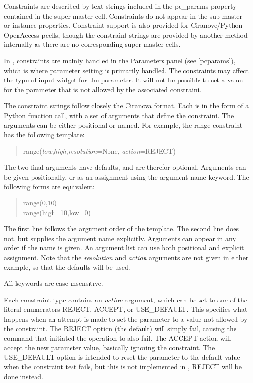 Constraints are described by text strings included in the {\et
pc\_params} property contained in the super-master cell.  Constraints
do not appear in the sub-master or instance properties.
\ifoa
Constraint support is also provided for Ciranove/Python OpenAccess
pcells, though the constraint strings are provided by another method
internally as there are no corresponding super-master {\Xic} cells.
\fi

In {\Xic}, constraints are mainly handled in the {\cb Parameters}
panel (see \ref{pcparams}), which is where parameter setting is
primarily handled.  The constraints may affect the type of input
widget for the parameter.  It will not be possible to set a value for
the parameter that is not allowed by the associated constraint.

The constraint strings follow closely the Ciranova format.  Each is in
the form of a Python function call, with a set of arguments that
define the constraint.  The arguments can be either positional or
named.  For example, the {\vt range} constraint has the following
template:

\begin{quote}
{\vt range(}{\it low\/},{\it high\/},{\it resolution\/}={\vt None},{\it
 action\/}={\vt REJECT)}
\end{quote}

The two final arguments have defaults, and are therefor optional. 
Arguments can be given positionally, or as an assignment using the
argument name keyword.  The following forms are equivalent:

\begin{quote} \vt
range(0,10)\\
range(high=10,low=0)
\end{quote}

The first line follows the argument order of the template.  The second
line does not, but supplies the argument name explicitly.  Arguments
can appear in any order if the name is given.  An argument list can
use both positional and explicit assignment.  Note that the {\it
resolution} and {\it action} arguments are not given in either
example, so that the defaults will be used.

All keywords are case-insensitive.

Each constraint type contains an {\it action} argument, which can be
set to one of the literal enumerators {\vt REJECT}, {\vt ACCEPT}, or
{\vt USE\_DEFAULT}.  This specifies what happens when an attempt is
made to set the parameter to a value not allowed by the constraint. 
The {\vt REJECT} option (the default) will simply fail, causing the
command that initiated the operation to also fail.  The {\vt ACCEPT}
action will accept the new parameter value, basically ignoring the
constraint.  The {\vt USE\_DEFAULT} option is intended to reset the
parameter to the default value when the constraint test fails, but
this is not implemented in {\Xic}, {\vt REJECT} will be done instead.

